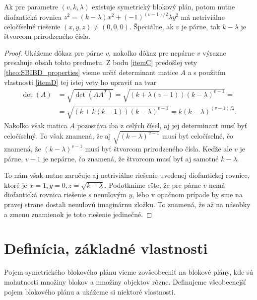 \begin{theorem_hard}
	Ak pre parametre $(v,k,\lambda)$ existuje symetrický blokový plán, potom nutne diofantická rovnica $z^2=(k-\lambda)x^2+(-1)^{(v-1)/2}\lambda y^2$ má netriviálne celočíselné riešenie $(x,y,z)\neq(0, 0, 0)$. Špeciálne, ak $v$ je párne, tak $k-\lambda$ je štvorcom prirodzeného čísla.
\end{theorem_hard}
\begin{proof}
Ukážeme dôkaz pre párne $v$, nakoľko dôkaz pre nepárne $v$ výrazne presahuje obsah tohto predmetu. Z bodu \ref{itemC} predošlej vety \ref{theo:SBIBD_properties} vieme určiť determinant matice $A$ a s použitím vlastnosti \ref{itemD} tej istej vety ho upraviť na tvar
\begin{align*}
	\det(A) &= \sqrt{\det(A A^T)} = \sqrt{(k + \lambda (v - 1)) (k - \lambda)^{v-1}}=\\
	&= \sqrt{(k + k(k-1)) (k - \lambda)^{v-1}} = k(k-\lambda)^{(v-1)/2}.
\end{align*}
Nakoľko však matica $A$ pozostáva iba z celých čísel, aj jej determinant musí byť celočíselný. To však znamená, že aj $\sqrt{(k-\lambda)^{v-1}}$ musí byť celočíselné, čo znamená, že $(k-\lambda)^{v-1}$ musí byť štvorcom prirodzeného čísla. Keďže ale $v$ je párne, $v-1$ je nepárne, čo znamená, že štvorcom musí byť aj samotné $k-\lambda$.

To nám však nutne zaručuje aj netriviálne riešenie uvedenej diofantickej rovnice, ktoré je $x=1, y=0, z=\sqrt{k-\lambda}$. Podotknime ešte, že pre párne $v$ nemá diofantická rovnica riešenie s nenulovým $y$, lebo v opačnom prípade by sme na pravej strane dostali nenulovú imaginárnu zložku. To znamená, že až na násobky a zmenu znamienok je toto riešenie jedinečné. 
\end{proof}

\section{Definícia, základné vlastnosti}
Pojem symetrického blokového plánu vieme zovšeobecniť na blokové plány, kde sú mohutnosti množiny blokov a množiny objektov rôzne. Definujeme všeobecnejší pojem blokového plánu a ukážeme si niektoré vlastnosti.

